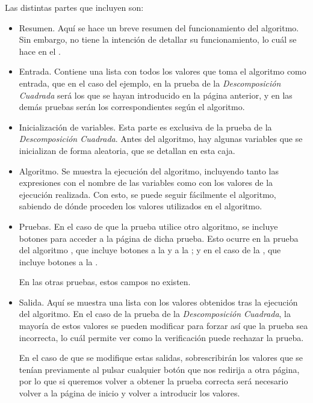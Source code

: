 Las distintas partes que incluyen son:
\begin{itemize}
    \item Resumen. Aquí se hace un breve resumen del funcionamiento del algoritmo. Sin embargo, no tiene la intención de detallar su funcionamiento, lo cuál se hace en el .

    \item Entrada. Contiene una lista con todos los valores que toma el algoritmo como entrada, que en el caso del ejemplo, en la prueba de la \emph{Descomposición Cuadrada} será los que se hayan introducido en la página anterior, y en las demás pruebas serán los correspondientes según el algoritmo.

    \item Inicialización de variables. Esta parte es exclusiva de la prueba de la \emph{Descomposición Cuadrada}. Antes del algoritmo, hay algunas variables que se inicializan de forma aleatoria, que se detallan en esta caja.

    \item Algoritmo. Se muestra la ejecución del algoritmo, incluyendo tanto las expresiones con el nombre de las variables como con los valores de la ejecución realizada. Con esto, se puede seguir fácilmente el algoritmo, sabiendo de dónde proceden los valores utilizados en el algoritmo.

    \item Pruebas. En el caso de que la prueba utilice otro algoritmo, se incluye botones para acceder a la página de dicha prueba. Esto ocurre en la prueba del algoritmo , que incluye botones a la  y a la ; y en el caso de la , que incluye botones a la .

    En las otras pruebas, estos campos no existen.

    \item Salida. Aquí se muestra una lista con los valores obtenidos tras la ejecución del algoritmo. En el caso de la prueba de la \emph{Descomposición Cuadrada}, la mayoría de estos valores se pueden modificar para forzar así que la prueba sea incorrecta, lo cuál permite ver como la verificación puede rechazar la prueba.

    En el caso de que se modifique estas salidas, sobrescribirán los valores que se tenían previamente al pulsar cualquier botón que nos redirija a otra página, por lo que si queremos volver a obtener la prueba correcta será necesario volver a la página de inicio y volver a introducir los valores.
\end{itemize}

